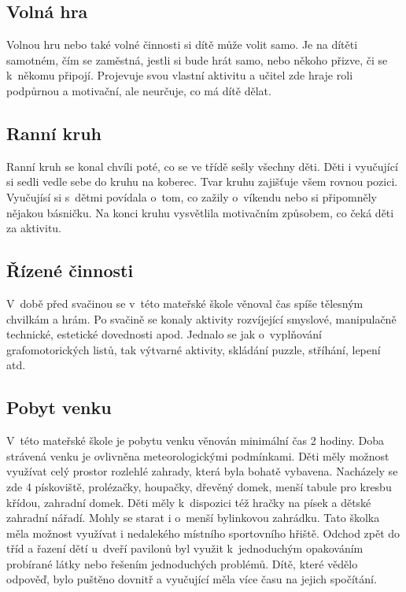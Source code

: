 		\subsection{Volná hra}

			Volnou hru nebo také volné činnosti si dítě může volit samo. Je na dítěti samotném, čím se zaměstná, jestli si bude hrát samo, nebo někoho přizve, či se k někomu připojí. Projevuje svou vlastní aktivitu a učitel zde hraje roli podpůrnou a motivační, ale neurčuje, co má dítě dělat. 

		\subsection{Ranní kruh}

			Ranní kruh se konal chvíli poté, co se ve třídě sešly všechny děti. Děti i vyučující si sedli vedle sebe do kruhu na koberec. Tvar kruhu zajišťuje všem rovnou pozici. Vyučujísí si s~dětmi povídala o~tom, co zažily o~víkendu nebo si připomněly nějakou básničku. Na konci kruhu vysvětlila motivačním způsobem, co čeká děti za aktivitu. 

		\subsection{Řízené činnosti}
		 	V~době před svačinou se v~této mateřské škole věnoval čas spíše tělesným chvilkám a hrám. Po svačině se konaly aktivity rozvíjející smyslové, manipulačně technické, estetické dovednosti apod. Jednalo se jak o~vyplňování grafomotorických listů, tak výtvarné aktivity, skládání puzzle, stříhání, lepení atd. 

		\subsection{Pobyt venku}
			V~této mateřské škole je pobytu venku věnován minimální čas 2 hodiny. Doba strávená venku je ovlivněna meteorologickými podmínkami. Děti měly možnost využívat celý prostor rozlehlé zahrady, která byla bohatě vybavena. Nacházely se zde 4 pískoviště, prolézačky, houpačky, dřevěný domek, menší tabule pro kresbu křídou, zahradní domek. Děti měly k~dispozici též hračky na písek a dětské zahradní nářadí. Mohly se starat i o~menší bylinkovou zahrádku. Tato školka měla možnost využívat i nedalekého místního sportovního hřiště. Odchod zpět do tříd a řazení dětí u~dveří pavilonů byl využit k~jednoduchým opakováním probírané látky nebo řešením jednoduchých problémů. Dítě, které vědělo odpověď, bylo puštěno dovnitř a vyučující měla více času na jejich spočítání.

